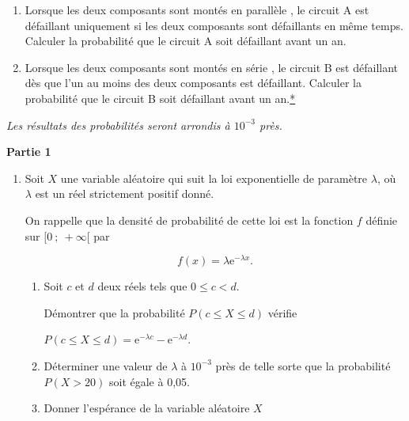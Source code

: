 \documentclass[12pt,french]{article}
\begin{document}
\begin{question}[subtitle={Antilles Guyane 2015}]
\medskip

\begin{enumerate}
\item Lorsque les deux composants sont montés \og en parallèle \fg, le circuit A est défaillant
uniquement si les deux composants sont défaillants en même temps. Calculer la probabilité
que le circuit A soit défaillant avant un an.
\item Lorsque les deux composants sont montés \og en série \fg, le circuit B est défaillant dès que l'un
au moins des deux composants est défaillant. Calculer la probabilité que le circuit B soit
défaillant avant un an.\hyperlink{Index}{*}
\end{enumerate}
 

\end{question}

\begin{question}[subtitle={Métropole 2015}]
\emph{Les résultats des probabilités seront arrondis à $10^{-3}$ près.}

\bigskip

\textbf{Partie 1}

\medskip

\begin{enumerate}
\item Soit $X$ une variable aléatoire qui suit la loi exponentielle de paramètre $\lambda$, où $\lambda$ est un réel strictement positif donné.

On rappelle que la densité de probabilité de cette loi est la fonction $f$  définie sur
$[0~;~+ \infty[$ par %

\[f(x) = \lambda\text{e}^{- \lambda x}.\]

	\begin{enumerate}
		\item Soit $c$ et $d$ deux réels tels que $0 \leqslant c < d$.
		
Démontrer que la probabilité $P( c \leqslant X \leqslant d)$ vérifie 

$P(c \leqslant X \leqslant d) = \text{e}^{- \lambda c}   - \text{e}^{- \lambda d}$.
		\item Déterminer une valeur de $\lambda$ à $10^{-3}$ près de telle sorte que la probabilité $P(X > 20)$ soit égale à 0,05.
		\item Donner l'espérance de la variable aléatoire $X$

\medskip
		

\end{enumerate}
\end{enumerate}
\end{question}
\end{document}
